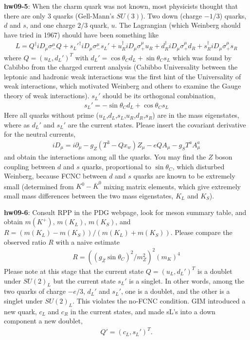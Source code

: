 \documentclass[12pt]{article}
\def\del{{\partial}}
\begin{document}
{\bf hw09-5}: When the charm quark was not known, most physicists thought
  that there are only 3 quarks (Gell-Mann's $SU(3)$).  Two down
  (charge $-1/3$) quarks, $d$ and $s$, and one charge $2/3$ quark, $u$.
  The Lagrangian (which Weinberg should have tried in 1967) should have been something like
\begin{eqnarray}
  L =  Q^\dagger  iD_\mu \sigma_-^\mu Q
  + {s_L'}^\dagger iD_\mu \sigma_-^\mu s_L'
  + u_R^\dagger  iD_\mu \sigma_+^\mu u_R
  + d_R^\dagger  iD_\mu \sigma_+^\mu d_R
  + s_R^\dagger  iD_\mu \sigma_+^\mu s_R
\end{eqnarray}
  where $Q = (u_L, d_L')^T$ with $d_L' = \cos\theta_C d_L + \sin\theta_C s_L$
  which was found by Cabibbo from the charged current analysis (Cabibbo
  Universality between the leptonic and hadronic weak interactions was
  the first hint of the Universality of weak interactions, which motivated
  Weinberg and others to examine the Gauge theory of weak interactions).
  $s_L'$ should be its orthogonal combination,
\begin{eqnarray}
  s_L' = -\sin\theta_C d_L + \cos\theta_C s_L
\end{eqnarray}
  Here all quarks without prime ($u_L$,$d_L$,$s_L$,$u_R$,$d_R$,$s_R$) are in the mass eigenstates, where as $d_L'$ and $s_L'$ are the current states.  Please insert the covariant derivative for the neutral currents,
\begin{eqnarray}
  iD_\mu = i\del_\mu -g_Z (T^3-Qx_w) Z_\mu -e Q A_\mu -g_S T^a A^a_\mu
\end{eqnarray}
 and obtain the interactions among all the quarks. You may find the
  $Z$ boson coupling between $d$ and $s$ quarks, proportional to 
$\sin\theta_C$, which disturbed Weinberg, because FCNC between $d$ and $s$ quarks are known to be extremely small (determined from $K^0-{\overline K^0}$ mixing matrix elements, which give extremely small mass differences between the
  two mass eigenstates, $K_L$ and $K_S$).

{\bf hw09-6}:  Consult RPP in the PDG webpage, look for meson summary 
table, and obtain $m(K^+)$, $m(K_L)$, $m(K_S)$, and $R=(m(K_L)-m(K_S))/(m(K_L)+m(K_S))$. Please compare the observed ratio $R$ with a naive estimate
\begin{eqnarray}
  R = ((g_Z  \sin\theta_C)^2/m_Z^2)^2 (m_K)^4
\end{eqnarray}
   Please note at this stage that the current state $Q=(u_L, d_L')^T$ is
  a doublet under $SU(2)_L$ but the current state $s_L'$ is a singlet.
  In other words, among the two quarks of charge $-e/3$, $d_L'$ and $s_L'$,
  one is a doublet, and the other is a singlet under $SU(2)_L$.
  This violates the no-FCNC condition.  GIM introduced a new quark,
  $c_L$ and $c_R$ in the current states, and made sL's into a down component
  a new doublet,
\begin{eqnarray}
  Q' = (c_L, s_L')^T.
\end{eqnarray}
 
\end{document}
